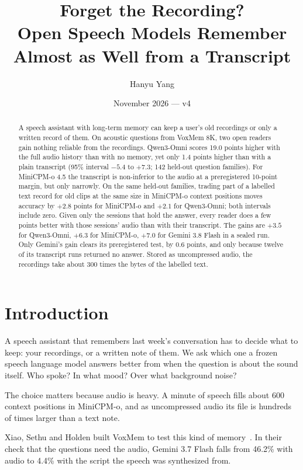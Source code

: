 \documentclass[11pt]{article}
\title{Forget the Recording?\\ Open Speech Models Remember Almost as Well from a Transcript}
\author{Hanyu Yang}
\date{November 2026 --- v4}
\begin{document}
\maketitle

\begin{abstract}
A speech assistant with long-term memory can keep a user's old recordings or only a written record of
them. On acoustic questions from VoxMem 8K, two open readers gain nothing reliable from the recordings.
Qwen3-Omni scores 19.0 points higher with the full audio history than with no memory, yet only 1.4 points
higher than with a plain transcript (95\% interval $-5.4$ to $+7.3$; 142 held-out question families). For
MiniCPM-o 4.5 the transcript is non-inferior to the audio at a preregistered 10-point margin, but only
narrowly. On the same held-out families, trading part of a labelled text record for old clips at the same
size in MiniCPM-o context positions moves accuracy by $+2.8$ points for MiniCPM-o and $+2.1$ for Qwen3-Omni;
both intervals include zero. Given only the sessions that hold the answer, every reader does a few points
better with those sessions' audio than with their transcript. The gains are $+3.5$ for Qwen3-Omni, $+6.3$ for MiniCPM-o, $+7.0$ for
Gemini 3.8 Flash in a sealed run. Only Gemini's gain clears its preregistered test, by 0.6 points, and only
because twelve of its transcript runs returned no answer. Stored as uncompressed audio, the recordings take about 300 times the bytes of the labelled text.
\end{abstract}

\section{Introduction}

A speech assistant that remembers last week's conversation has to decide what to keep: your recordings, or
a written note of them. We ask which one a frozen speech language model answers better from when the
question is about the sound itself. Who spoke? In what mood? Over what background noise?

The choice matters because audio is heavy. A minute of speech fills about 600 context positions in
MiniCPM-o, and as uncompressed audio its file is hundreds of times larger than a text note.

Xiao, Sethu and Holden built VoxMem to test this kind of memory~\cite{voxmem}. In their check that the questions
need the audio, Gemini 3.7 Flash falls from 46.2\% with audio to 4.4\% with the script the speech was
synthesized from.
\end{document}
